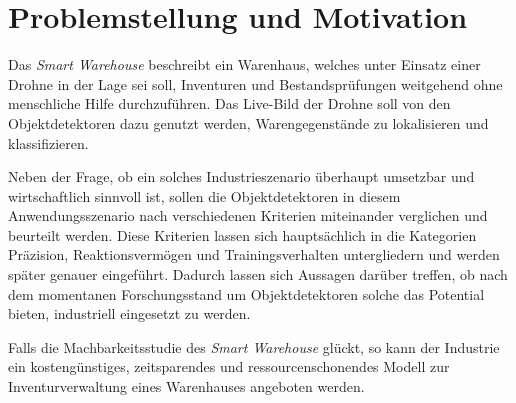\section{Problemstellung und Motivation}

Das \textit{Smart Warehouse} beschreibt ein Warenhaus, welches unter Einsatz einer Drohne in der Lage sei soll, Inventuren und Bestandsprüfungen weitgehend ohne menschliche Hilfe durchzuführen. Das Live-Bild der Drohne soll von den Objektdetektoren dazu genutzt werden, Warengegenstände zu lokalisieren und klassifizieren. 

Neben der Frage, ob ein solches Industrieszenario überhaupt umsetzbar und wirtschaftlich sinnvoll ist, sollen die Objektdetektoren in diesem Anwendungsszenario nach verschiedenen Kriterien miteinander verglichen und beurteilt werden. Diese Kriterien lassen sich hauptsächlich in die Kategorien Präzision, Reaktionsvermögen und Trainingsverhalten untergliedern und werden später genauer eingeführt. Dadurch lassen sich Aussagen darüber treffen, ob nach dem momentanen Forschungsstand um Objektdetektoren solche das Potential bieten, industriell eingesetzt zu werden. 

Falls die Machbarkeitsstudie des \textit{Smart Warehouse} glückt, so kann der Industrie ein kostengünstiges, zeitsparendes und ressourcenschonendes Modell zur Inventurverwaltung eines Warenhauses angeboten werden.